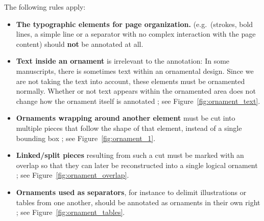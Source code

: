 The following rules apply:

\begin{itemize}
  \item \textbf{The typographic elements for page organization.} (e.g.\ (strokes, bold lines, a simple line or a separator with no complex interaction with the page content) should \textbf{not} be annotated at all.

  \item \textbf{Text inside an ornament} is irrelevant to the annotation: In some manuscripts, there is sometimes text within an ornamental design. Since we are not taking the text into account, these elements must be ornamented normally. Whether or not text appears within the ornamented area does not change how the ornament itself is annotated ; see Figure~\ref{fig:ornament_text}.

  \item \textbf{Ornaments wrapping around another element} must be cut into multiple pieces that follow the shape of that element, instead of a single bounding box ; see Figure~\ref{fig:ornament_1}.

  \item \textbf{Linked/split pieces} resulting from such a cut must be marked with an overlap so that they can later be reconstructed into a single logical ornament ; see Figure~\ref{fig:ornament_overlap}.

  \item \textbf{Ornaments used as separators}, for instance to delimit illustrations or tables from one another, should be annotated as ornaments in their own right ; see Figure~\ref{fig:ornament_tables}.
\end{itemize}


